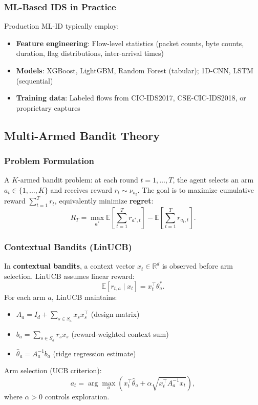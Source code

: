 \documentclass[review]{elsarticle}
\begin{document}
\subsubsection{ML-Based IDS in Practice}
Production ML-ID typically employ:
\begin{itemize}
\item \textbf{Feature engineering}: Flow-level statistics (packet counts, byte counts, duration, flag distributions, inter-arrival times)
\item \textbf{Models}: XGBoost, LightGBM, Random Forest (tabular); 1D-CNN, LSTM (sequential)
\item \textbf{Training data}: Labeled flows from CIC-IDS2017, CSE-CIC-IDS2018, or proprietary captures
\end{itemize}

\subsection{Multi-Armed Bandit Theory}
\subsubsection{Problem Formulation}
A $K$-armed bandit problem: at each round $t = 1, \dots, T$, the agent selects an arm $a_t \in \{1, \dots, K\}$ and receives reward $r_t \sim \nu_{a_t}$. The goal is to maximize cumulative reward $\sum_{t=1}^T r_t$, equivalently minimize \textbf{regret}:
\[
R_T = \max_{a^*} \mathbb{E}\left[\sum_{t=1}^T r_{a^*,t}\right] - \mathbb{E}\left[\sum_{t=1}^T r_{a_t,t}\right].
\]

\subsubsection{Contextual Bandits (LinUCB)}
In \textbf{contextual bandits}, a context vector $x_t \in \mathbb{R}^d$ is observed before arm selection. LinUCB \cite{li2010contextual} assumes linear reward:
\[
\mathbb{E}[r_{t,a} \mid x_t] = x_t^\top \theta_a^*.
\]
For each arm $a$, LinUCB maintains:
\begin{itemize}
\item $A_a = I_d + \sum_{s \in S_a} x_s x_s^\top$ (design matrix)
\item $b_a = \sum_{s \in S_a} r_s x_s$ (reward-weighted context sum)
\item $\hat{\theta}_a = A_a^{-1} b_a$ (ridge regression estimate)
\end{itemize}
Arm selection (UCB criterion):
\[
a_t = \arg\max_a \left( x_t^\top \hat{\theta}_a + \alpha \sqrt{x_t^\top A_a^{-1} x_t} \right),
\]
where $\alpha > 0$ controls exploration.
\end{document}
